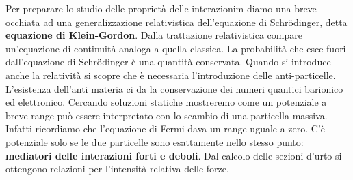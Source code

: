 Per preparare lo studio delle proprietà delle interazionim diamo una breve occhiata ad una generalizzazione relativistica dell'equazione di Schr\"odinger, detta \textbf{equazione di Klein-Gordon}. Dalla trattazione relativistica compare un'equazione di continuità analoga a quella classica. La probabilità che esce fuori dall'equazione di Schr\"odinger è una quantità conservata. Quando si introduce anche la relatività si scopre che è necessaria l'introduzione delle anti-particelle. L'esistenza dell'anti materia ci da la conservazione dei numeri quantici barionico ed elettronico. Cercando soluzioni statiche mostreremo come un potenziale a breve range può essere interpretato con lo scambio di una particella massiva. Infatti ricordiamo che l'equazione di Fermi dava un range uguale a zero. C'è potenziale solo se le due particelle sono esattamente nello stesso punto: \textbf{mediatori delle interazioni forti e deboli}. Dal calcolo delle sezioni d'urto si ottengono relazioni per l'intensità relativa delle forze.

